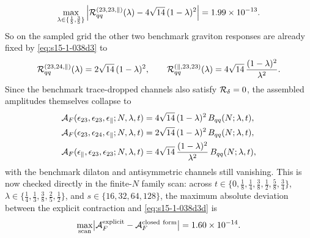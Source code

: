 \documentclass[11pt]{article}
\numberwithin{equation}{section}
\begin{document}
\begin{equation}
\label{eq:s15-1-038d3b2}
\max_{\lambda\in\{\frac15,\frac35\}}
\left|
{\cal R}^{(23,23,\parallel)}_{qq}(\lambda)
-4\sqrt{14}\,(1-\lambda)^2
\right|
=1.99\times 10^{-13}.
\end{equation}
So on the sampled grid the other two benchmark graviton responses are already
fixed by \eqref{eq:s15-1-038d3} to
\begin{equation}
\label{eq:s15-1-038d3c}
{\cal R}^{(23,24,\parallel)}_{qq}(\lambda)
=
2\sqrt{14}\,(1-\lambda)^2,
\qquad
{\cal R}^{(\parallel,23,23)}_{qq}(\lambda)
=
4\sqrt{14}\,\frac{(1-\lambda)^2}{\lambda^2}.
\end{equation}
Since the benchmark trace-dropped channels also satisfy
\(
{\cal R}_\delta=0
\),
the assembled amplitudes themselves collapse to
\begin{equation}
\label{eq:s15-1-038d3d}
\begin{aligned}
{\cal A}_F(\epsilon_{23},\epsilon_{23},\epsilon_\parallel;N,\lambda,t)
&=
4\sqrt{14}\,(1-\lambda)^2\,B_{qq}(N;\lambda,t),\\
{\cal A}_F(\epsilon_{23},\epsilon_{24},\epsilon_\parallel;N,\lambda,t)
&=
2\sqrt{14}\,(1-\lambda)^2\,B_{qq}(N;\lambda,t),\\
{\cal A}_F(\epsilon_\parallel,\epsilon_{23},\epsilon_{23};N,\lambda,t)
&=
4\sqrt{14}\,\frac{(1-\lambda)^2}{\lambda^2}\,B_{qq}(N;\lambda,t),
\end{aligned}
\end{equation}
with the benchmark dilaton and antisymmetric channels still vanishing. This is
now checked directly in the finite-$N$ family scan: across
\(
t\in\{0,\frac18,\frac14,\frac38,\frac12,\frac58,\frac34\}
\),
\(
\lambda\in\{\frac14,\frac13,\frac38,\frac25,\frac12\}
\),
and
\(
s\in\{16,32,64,128\}
\),
the maximum absolute deviation between the explicit contraction and
\eqref{eq:s15-1-038d3d} is
\begin{equation}
\label{eq:s15-1-038d3e}
\max_{\rm scan}
\bigl|
{\cal A}_F^{\rm explicit}
-{\cal A}_F^{\rm closed\ form}
\bigr|
=1.60\times 10^{-14}.
\end{equation}
\end{document}
